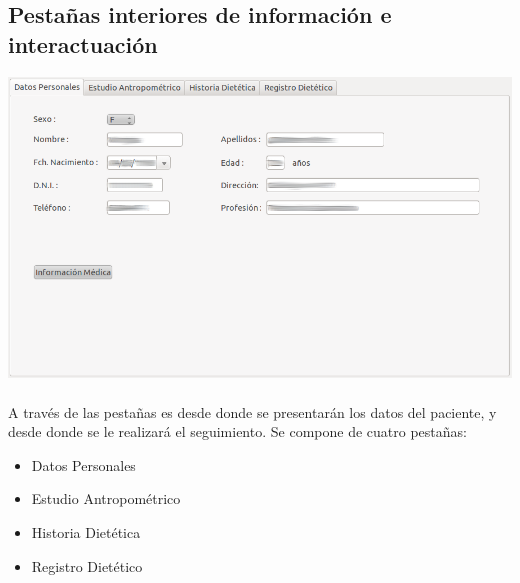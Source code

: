 \documentclass[12pt, spanish]{article}
\begin{document}
\subsection{Pestañas interiores de información e interactuación}
\includegraphics[scale=0.5]{Image/pestanas.png}\\\\
A través de las pestañas es desde donde se presentarán los datos del paciente, y desde donde se le realizará el seguimiento.
Se compone de cuatro pestañas:
\begin{itemize}
\item Datos Personales
\item Estudio Antropométrico
\item Historia Dietética
\item Registro Dietético
\end{itemize}
\newpage
\end{document}
